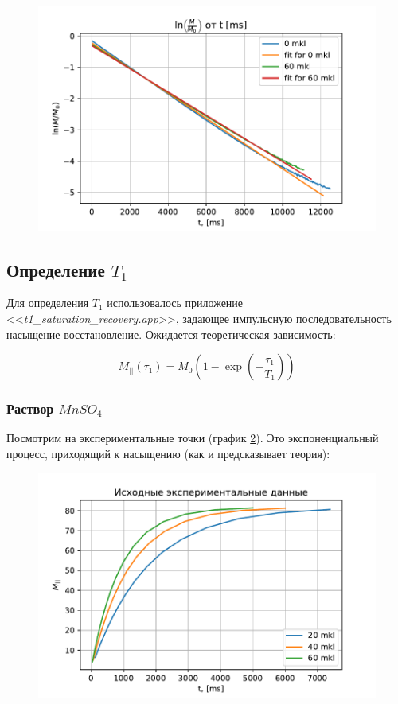 \begin{figure}[!h]
	\hspace{-5em}
	\includegraphics[width=1.2\linewidth]{data/Na_T_2_reg}
	\caption{}
	\label{fig:nat2reg}
\end{figure}

\subsection{Определение $ T_1 $}
Для определения $ T_1 $ использовалось приложение <<\textit{t1\_saturation\_recovery.app}>>, задающее импульсную последовательность насыщение-восстановление. Ожидается теоретическая зависимость:

\begin{equation}
\label{eq:M_parall-from-T1}
M_{||} (\tau_1) = M_0 \left(1 - \exp \left( -\dfrac{\tau_1}{T_1} \right) \right)
\end{equation}

\subsubsection{Раствор $ Mn SO_4 $}
Посмотрим на экспериментальные точки (график \ref{fig:mnt1exp}). Это экспоненциальный процесс, приходящий к насыщению (как и предсказывает теория):

\begin{figure}[!h]
	\hspace{-5em}
	\includegraphics[width=1.2\linewidth]{data/Mn_T_1_exp}
	\caption{}
	\label{fig:mnt1exp}
\end{figure}


